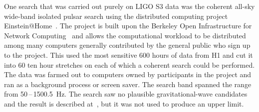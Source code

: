 \documentclass{article}
\begin{document}
One search that was carried out purely on LIGO S3 data was the coherent all-sky
wide-band isolated pulsar search using the distributed computing project
Einstein@Home~\cite{eath}. The project is built upon the Berkeley Open
Infrastructure for Network Computing~\cite{BOINC} and allows the computational
workload to be distributed among many computers generally contributed by the
general public who sign up to the project. This used the most sensitive 600
hours of data from H1 and cut it into 60 ten hour stretches on each of which
a coherent search could be performed. The data was farmed out to computers owned
by participants in the project and ran as a background process or screen saver.
The search band spanned the range from 50\,--\,1500.5~Hz. The search saw no
plausible gravitational-wave candidates and the result is described
at~\cite{eathS3}, but it was not used to produce an upper limit.
\end{document}
